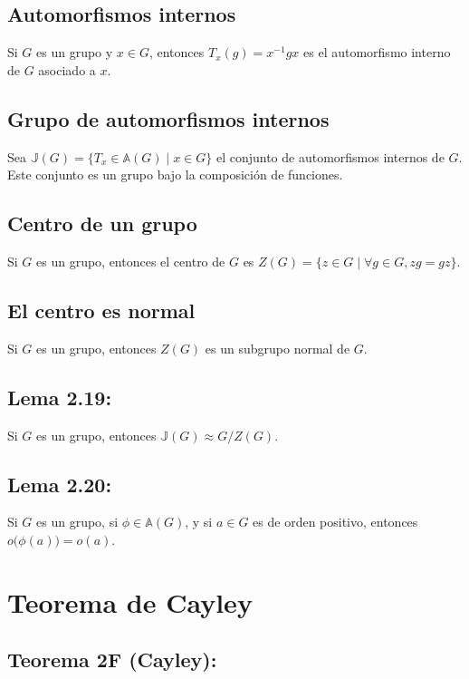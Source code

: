 \documentclass{article}
\begin{document}
\subsection*{\color{violet} Automorfismos internos}

Si $G$ es un grupo y $x\in G$, entonces $T_x(g)=x^{-1}gx$ es el automorfismo interno de $G$ asociado a $x$.

\subsection*{\color{purple} Grupo de automorfismos internos}

Sea $\mathbb{J}(G)=\{T_x\in\mathbb{A}(G)\mid x\in G\}$ el conjunto de automorfismos internos de $G$. Este conjunto es un grupo bajo la composición de funciones.

\subsection*{\color{violet} Centro de un grupo}

Si $G$ es un grupo, entonces el centro de $G$ es $Z(G)=\{z\in G\mid \forall g\in G, zg=gz\}$.

\subsection*{\color{purple} El centro es normal}

Si $G$ es un grupo, entonces $Z(G)$ es un subgrupo normal de $G$.

\subsection*{\color{blue} Lema 2.19:}

Si $G$ es un grupo, entonces $\mathbb{J}(G)\approx G/Z(G)$.

\subsection*{\color{blue} Lema 2.20:}

Si $G$ es un grupo, si $\phi\in\mathbb{A}(G)$, y si $a\in G$ es de orden positivo, entonces $o\big(\phi(a)\big)=o(a)$.

\newpage
\section{Teorema de Cayley}

\subsection*{\color{red} Teorema 2F (Cayley):}
\end{document}
